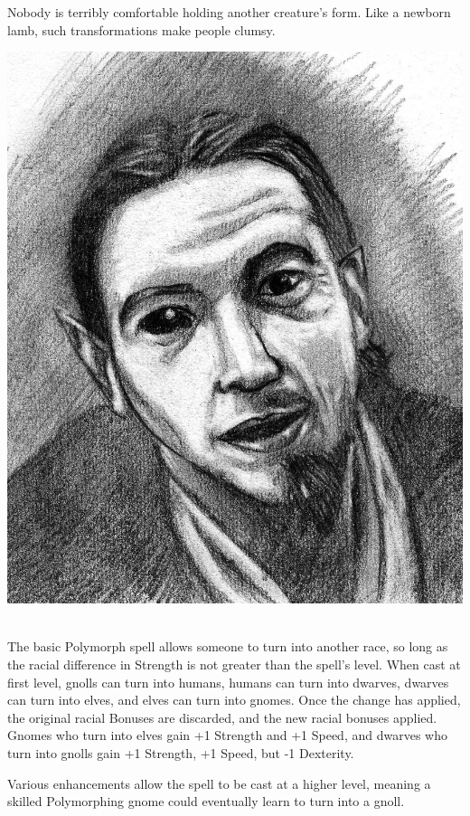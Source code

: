 \begin{multicols}{2}
Nobody is terribly comfortable holding another creature's form.  Like a newborn lamb, such transformations make people clumsy.

\spelllevel

\noindent\includegraphics[width=\linewidth]{images/Roch_Hercka/polymorph.jpg}
\label{roch:polymorph}

\\
The basic Polymorph spell allows someone to turn into another race, so long as the racial difference in Strength is not greater than the spell's level.
When cast at first level, gnolls can turn into humans, humans can turn into dwarves, dwarves can turn into elves, and elves can turn into gnomes.
Once the change has applied, the original racial Bonuses are discarded, and the new racial bonuses applied.
Gnomes who turn into elves gain +1 Strength and +1 Speed, and dwarves who turn into gnolls gain +1 Strength, +1 Speed, but -1 Dexterity.

Various enhancements allow the spell to be cast at a higher level, meaning a skilled Polymorphing gnome could eventually learn to turn into a gnoll.


\end{multicols}

